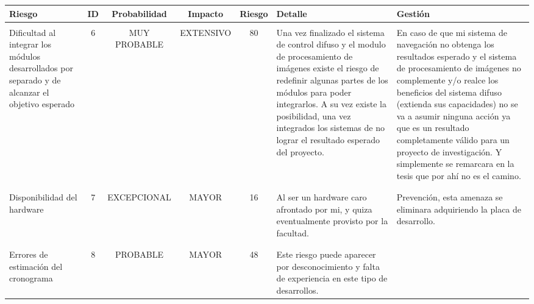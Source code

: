 \newpage

\begin{table}[h!]
        \scriptsize
        \hspace{-1.5cm}
        \begin{tabular}{ p{3cm} c c c c p{4cm} p{4cm} }
            \\\hline 
            \bf \bf Riesgo & \bf ID & \bf Probabilidad & \bf Impacto & \bf Riesgo & \bf Detalle & \bf Gestión \\
            \hline
            
            &&&&&&\\
            Dificultad al integrar los módulos desarrollados por separado y de alcanzar el objetivo esperado &
            6 &
            MUY PROBABLE &
            EXTENSIVO &
            80\cellcolor{red} &
            Una vez finalizado el sistema de control difuso y el modulo de procesamiento de imágenes existe el riesgo de redefinir algunas partes de los módulos para poder integrarlos. A su vez existe la posibilidad, una vez integrados los sistemas de no lograr el resultado esperado del proyecto. & 
            En caso de que mi sistema de navegación no obtenga los resultados esperado y el sistema de procesamiento de imágenes no complemente y/o realce los beneficios del sistema difuso (extienda sus capacidades) no se va a asumir ninguna acción ya que es un resultado completamente válido para un proyecto de investigación. Y simplemente se remarcara en la tesis que por ahí no es el camino.
            \\\\\hline 
            
            &&&&&&\\
            Disponibilidad del hardware &
            7 &
            EXCEPCIONAL &
            MAYOR &
            16\cellcolor{green} &
            Al ser un hardware caro afrontado por mi, y quiza eventualmente provisto por la facultad. & 
            Prevención, esta amenaza se eliminara adquiriendo la placa de desarrollo.
            \\\\\hline 
            
            &&&&&&\\
            Errores de estimación del cronograma &
            8 &
            PROBABLE &
            MAYOR &
            48\cellcolor{yellow} &
            Este riesgo puede aparecer por desconocimiento y falta de experiencia en este tipo de desarrollos. & 
            

\end{tabular}
\end{table}
